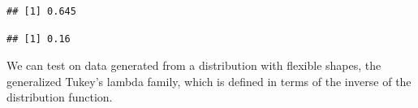 \begin{knitrout}
\begin{kframe}
\begin{alltt}
 \hlkwb{<-} \hlstd{(}\hlstd{,}   \hlstd{=} \hlstd{))}
 \hlopt{<} \hlstd{)}
\end{alltt}
\begin{verbatim}
## [1] 0.645
\end{verbatim}
\begin{alltt}
 \hlkwb{<-} \hlstd{(}\hlstd{,}   \hlstd{=} \hlstd{))}
 \hlopt{<} \hlstd{)}
\end{alltt}
\begin{verbatim}
## [1] 0.16
\end{verbatim}
\end{kframe}
\end{knitrout}


We can test on data generated from a distribution with flexible
shapes, the generalized Tukey's lambda family, which is defined in
terms of the inverse of the distribution function.
\begin{knitrout}
\color{fgcolor}\begin{kframe}
\begin{alltt}
 \hlkwb{<-} \hlstd{(}\hlstd{,}  \hlstd{=} \hlstd{,}  \hlstd{=} \hlstd{,}  \hlstd{=} \hlstd{,}  \hlstd{=} \hlstd{) \{}
     \hlkwb{<-} 
     \hlopt{+}  \hlopt{^}  \hlopt{-} \hlstd{(} \hlopt{-}  \hlopt{^}  \hlopt{/} 
\hlstd{\}}

 \hlkwb{<-} \hlstd{(}\hlstd{,}
                        \hlstd{(}\hlstd{)}   \hlstd{=} \hlstd{,}  \hlstd{=} \hlstd{),}
                         \hlstd{=} \hlstd{))}
\end{alltt}
\end{kframe}
\end{knitrout}
